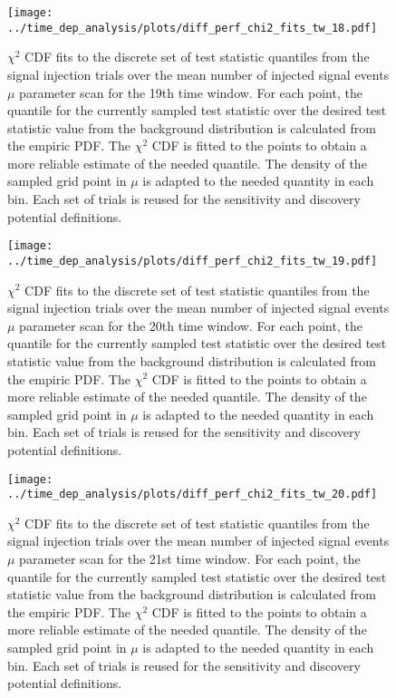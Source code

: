 \begin{figure}[H]
  \centering
  \texttt{[image: ../time\_dep\_analysis/plots/diff\_perf\_chi2\_fits\_tw\_18.pdf]}
  \caption[$\chi^2$ CDF fits for the 19th time window differential performance]{
     $\chi^2$ CDF fits to the discrete set of test statistic quantiles from the signal injection trials over the mean number of injected signal events $\mu$ parameter scan for the 19th time window.
     For each point, the quantile for the currently sampled test statistic over the desired test statistic value from the background distribution is calculated from the empiric PDF.
     The $\chi^2$ CDF is fitted to the points to obtain a more reliable estimate of the needed quantile.
     The density of the sampled grid point in $\mu$ is adapted to the needed quantity in each bin.
     Each set of trials is reused for the sensitivity and discovery potential definitions.
  }
  \label{fig:diff_perf_chi2_fits_tw_18}
\end{figure}
\begin{figure}[H]
  \centering
  \texttt{[image: ../time\_dep\_analysis/plots/diff\_perf\_chi2\_fits\_tw\_19.pdf]}
  \caption[$\chi^2$ CDF fits for the 20th time window differential performance]{
     $\chi^2$ CDF fits to the discrete set of test statistic quantiles from the signal injection trials over the mean number of injected signal events $\mu$ parameter scan for the 20th time window.
     For each point, the quantile for the currently sampled test statistic over the desired test statistic value from the background distribution is calculated from the empiric PDF.
     The $\chi^2$ CDF is fitted to the points to obtain a more reliable estimate of the needed quantile.
     The density of the sampled grid point in $\mu$ is adapted to the needed quantity in each bin.
     Each set of trials is reused for the sensitivity and discovery potential definitions.
  }
  \label{fig:diff_perf_chi2_fits_tw_19}
\end{figure}
\begin{figure}[H]
  \centering
  \texttt{[image: ../time\_dep\_analysis/plots/diff\_perf\_chi2\_fits\_tw\_20.pdf]}
  \caption[$\chi^2$ CDF fits for the 21st time window differential performance]{
     $\chi^2$ CDF fits to the discrete set of test statistic quantiles from the signal injection trials over the mean number of injected signal events $\mu$ parameter scan for the 21st time window.
     For each point, the quantile for the currently sampled test statistic over the desired test statistic value from the background distribution is calculated from the empiric PDF.
     The $\chi^2$ CDF is fitted to the points to obtain a more reliable estimate of the needed quantile.
     The density of the sampled grid point in $\mu$ is adapted to the needed quantity in each bin.
     Each set of trials is reused for the sensitivity and discovery potential definitions.
  }
  \label{fig:diff_perf_chi2_fits_tw_20}
\end{figure}


